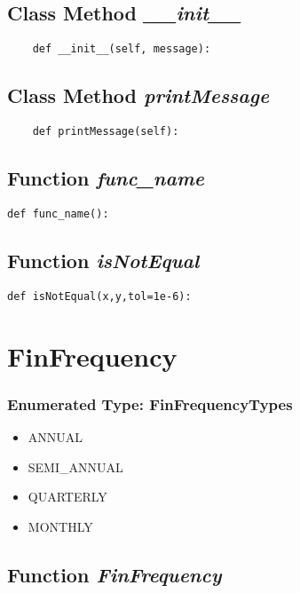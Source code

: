 \documentclass[twoside,11pt]{book}
\begin{document}
\subsection{Class Method {\it \_\_init\_\_}}


\begin{lstlisting}
    def __init__(self, message):
\end{lstlisting}

\subsection{Class Method {\it printMessage}}


\begin{lstlisting}
    def printMessage(self):
\end{lstlisting}

\subsection{Function {\it func\_name}}


\begin{lstlisting}
def func_name():
\end{lstlisting}

\subsection{Function {\it isNotEqual}}


\begin{lstlisting}
def isNotEqual(x,y,tol=1e-6):
\end{lstlisting}

\newpage
\section{FinFrequency}

\subsubsection{Enumerated Type: FinFrequencyTypes}
\begin{itemize}
\item{ANNUAL}
\item{SEMI\_ANNUAL}
\item{QUARTERLY}
\item{MONTHLY}
\end{itemize}

\subsection{Function {\it FinFrequency}}
\end{document}
